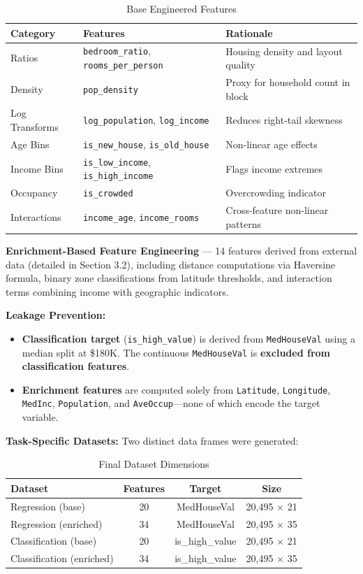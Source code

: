 \documentclass[12pt,a4paper]{article}
\begin{document}
\begin{table}[H]
\centering
\caption{Base Engineered Features}
\begin{tabular}{lp{4.5cm}p{5.5cm}}
\toprule
\textbf{Category} & \textbf{Features} & \textbf{Rationale} \\
\midrule
Ratios & \texttt{bedroom\_ratio}, \texttt{rooms\_per\_person} & Housing density and layout quality \\
Density & \texttt{pop\_density} & Proxy for household count in block \\
Log Transforms & \texttt{log\_population}, \texttt{log\_income} & Reduces right-tail skewness \\
Age Bins & \texttt{is\_new\_house}, \texttt{is\_old\_house} & Non-linear age effects \\
Income Bins & \texttt{is\_low\_income}, \texttt{is\_high\_income} & Flags income extremes \\
Occupancy & \texttt{is\_crowded} & Overcrowding indicator \\
Interactions & \texttt{income\_age}, \texttt{income\_rooms} & Cross-feature non-linear patterns \\
\bottomrule
\end{tabular}
\end{table}

\textbf{Enrichment-Based Feature Engineering} --- 14 features derived from external data (detailed in Section 3.2), including distance computations via Haversine formula, binary zone classifications from latitude thresholds, and interaction terms combining income with geographic indicators.

\textbf{Leakage Prevention:}
\begin{itemize}
    \item \textbf{Classification target} (\texttt{is\_high\_value}) is derived from \texttt{MedHouseVal} using a median split at \$180K. The continuous \texttt{MedHouseVal} is \textbf{excluded from classification features}.
    \item \textbf{Enrichment features} are computed solely from \texttt{Latitude}, \texttt{Longitude}, \texttt{MedInc}, \texttt{Population}, and \texttt{AveOccup}---none of which encode the target variable.
\end{itemize}

\textbf{Task-Specific Datasets:} Two distinct data frames were generated:

\begin{table}[H]
\centering
\caption{Final Dataset Dimensions}
\begin{tabular}{lccc}
\toprule
\textbf{Dataset} & \textbf{Features} & \textbf{Target} & \textbf{Size} \\
\midrule
Regression (base) & 20 & MedHouseVal & 20,495 $\times$ 21 \\
Regression (enriched) & 34 & MedHouseVal & 20,495 $\times$ 35 \\
Classification (base) & 20 & is\_high\_value & 20,495 $\times$ 21 \\
Classification (enriched) & 34 & is\_high\_value & 20,495 $\times$ 35 \\
\bottomrule
\end{tabular}
\end{table}
\end{document}
